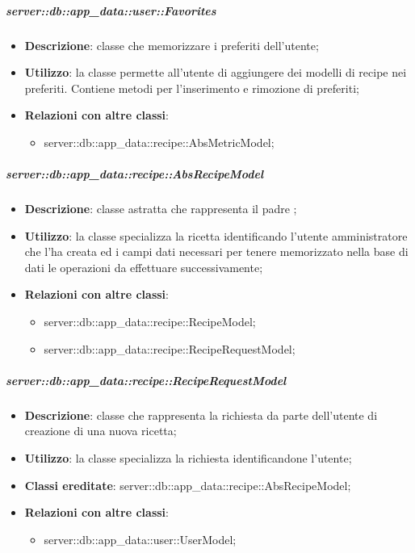 		\subparagraph{server::db::app\_data::user::Favorites} %
		\label{subp:server_db_app_data_user_favorites}
			\begin{itemize}
				\item \textbf{Descrizione}: classe che memorizzare i preferiti dell'utente;
				\item \textbf{Utilizzo}: la classe  permette all'utente di aggiungere dei modelli di recipe nei preferiti. Contiene metodi per l'inserimento e rimozione di preferiti;
				\item \textbf{Relazioni con altre classi}:
					\begin{itemize}
						\item server::db::app\_data::recipe::AbsMetricModel;
					\end{itemize}
			\end{itemize}


		\subparagraph{server::db::app\_data::recipe::AbsRecipeModel} %
		\label{subp:server_db_app_data_recipe_absrecipemodel}
			\begin{itemize}
				\item \textbf{Descrizione}: classe astratta che rappresenta il padre ;
				\item \textbf{Utilizzo}: la classe specializza la ricetta identificando l'utente amministratore che l'ha creata ed i campi dati necessari per tenere memorizzato nella base di dati le operazioni da effettuare successivamente;
				\item \textbf{Relazioni con altre classi}:
					\begin{itemize}
						\item server::db::app\_data::recipe::RecipeModel;
						\item server::db::app\_data::recipe::RecipeRequestModel;
					\end{itemize}
			\end{itemize}


		\subparagraph{server::db::app\_data::recipe::RecipeRequestModel} %
		\label{subp:server_db_app_data_recipe_reciperequestmodel}
			\begin{itemize}
				\item \textbf{Descrizione}: classe che rappresenta la richiesta da parte dell'utente di creazione di una nuova ricetta;
				\item \textbf{Utilizzo}: la classe specializza la richiesta identificandone l'utente;
				\item \textbf{Classi ereditate}: server::db::app\_data::recipe::AbsRecipeModel;
				\item \textbf{Relazioni con altre classi}:
					\begin{itemize}
						\item server::db::app\_data::user::UserModel;
					\end{itemize}
			\end{itemize}


